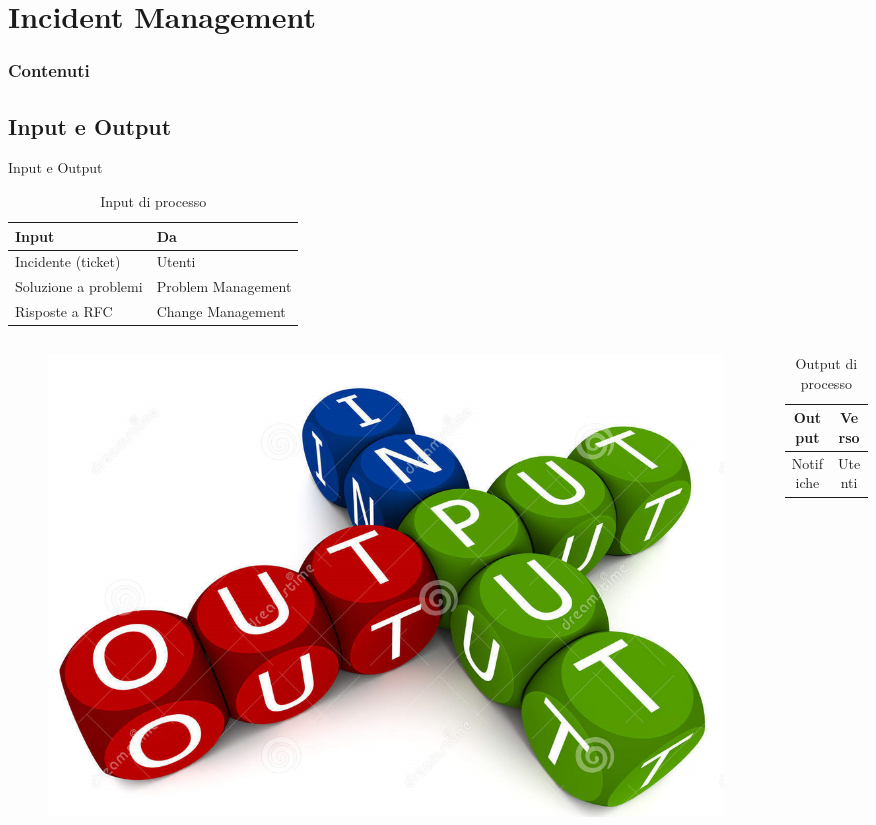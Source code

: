 %
\section{Incident Management}
\frame
{
\frametitle{Contenuti}
\tableofcontents[currentsection]
}

\subsection*{Input e Output}
\begin{frame}{Input e Output}
\begin{table}
\begin{tabular}{ l | l }
\textbf{Input} & \textbf{Da}\\
\hline
Incidente (ticket) & Utenti\\
Soluzione a problemi & Problem Management\\
Risposte a RFC & Change Management\\
\end{tabular}
\caption{Input di processo}
\end{table}
\begin{columns}
\begin{column}{0.3\textwidth}
\begin{figure}
\includegraphics[scale=0.1]{Images/Input_output.png}
\end{figure}
\end{column}
\begin{column}{0.7\textwidth}
\begin{table}
\begin{tabular}{ c | c }
\textbf{Output} & \textbf{Verso}\\
\hline
Notifiche & Utenti\\
\end{tabular}
\caption{Output di processo}
\end{table}
\end{column}
\end{columns}
\end{frame}

